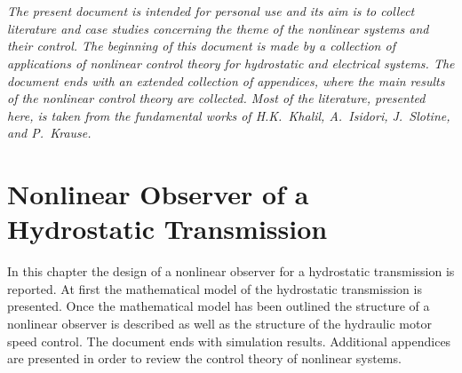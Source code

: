 \documentclass[11pt,a4paper,oneside]{book}
\title{\textbf{ 
	\begin{LARGE}
		Nonlinear Observers
	\end{LARGE} \\[24pt]
	\begin{Large}
		Application to the Hydrostatic Transmissions \\[6pt] and Electrical Machinery
	\end{Large}}
}
\author{\textbf{Davide Bagnara}}
\numberwithin{equation}{section}
\theoremstyle{it}
\theoremstyle{definition}
\begin{document}
	\thispagestyle{firstpage}
	\begin{mybox}
		\maketitle
		\vspace{120mm}
	\end{mybox}
	\newpage
	\tableofcontents
	\listoffigures	
	\listoftables
	\newpage
	
\chapter*{}	
\begin{adjustwidth}{50pt}{50pt}
		\textit{The present document is intended for personal use and its aim is to collect literature and case studies concerning the theme of the nonlinear systems and their control. The beginning of this document is made by a collection of applications of nonlinear control theory for hydrostatic and electrical systems. The document ends with an extended collection of appendices, where the main results of the nonlinear control theory are collected. Most of the literature, presented here, is taken from the fundamental works of H.K.~Khalil, A.~Isidori, J.~Slotine, and P.~Krause.}
\end{adjustwidth}



\chapter{Nonlinear Observer of a Hydrostatic Transmission}	
	In this chapter the design of a nonlinear observer for 
	a hydrostatic transmission is reported. At first the mathematical model of the 
	hydrostatic transmission is presented. Once the mathematical model has been outlined the 
	structure of a nonlinear observer is described as well as the structure of 
	the hydraulic motor speed control. The document ends with simulation 
	results. Additional appendices are presented in order to review the control 
	theory of nonlinear systems.
	
\end{document}
